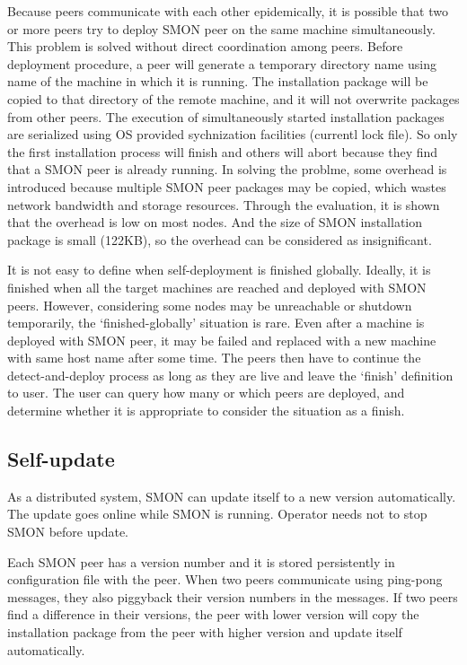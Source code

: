 Because peers communicate with each other epidemically, it
is possible that two or more peers try to deploy SMON peer
on the same machine simultaneously. This problem is solved
without direct coordination among peers. Before deployment
procedure, a peer will generate a temporary directory name
using name of the machine in which it is running. The
installation package will be copied to that directory of the
remote machine, and it will not overwrite packages from
other peers. The execution of simultaneously started
installation packages are serialized using OS provided
sychnization facilities (currentl lock file). So only the
first installation process will finish and others will abort
because they find that a SMON peer is already running. In
solving the problme, some overhead is introduced because
multiple SMON peer packages may be copied, which wastes
network bandwidth and storage resources. Through the
evaluation, it is shown that the overhead is low on most
nodes. And the size of SMON installation package is small
(122KB), so the overhead can be considered as insignificant.

It is not easy to define when self-deployment is finished
globally. Ideally, it is finished when all the target
machines are reached and deployed with SMON peers.  However,
considering some nodes may be unreachable or shutdown
temporarily, the `finished-globally' situation is rare. Even
after a machine is deployed with SMON peer, it may be failed
and replaced with a new machine with same host name after
some time. The peers then have to continue the
detect-and-deploy process as long as they are live and leave
the `finish' definition to user. The user can query how many
or which peers are deployed, and determine whether it is
appropriate to consider the situation as a finish.

\subsection{Self-update}

As a distributed system, SMON can update itself to a new
version automatically. The update goes online while SMON is
running. Operator needs not to stop SMON before update.

Each SMON peer has a version number and it is stored
persistently in configuration file with the peer. When two
peers communicate using ping-pong messages, they also
piggyback their version numbers in the messages. If two
peers find a difference in their versions, the peer with
lower version will copy the installation package from the
peer with higher version and update itself automatically.

